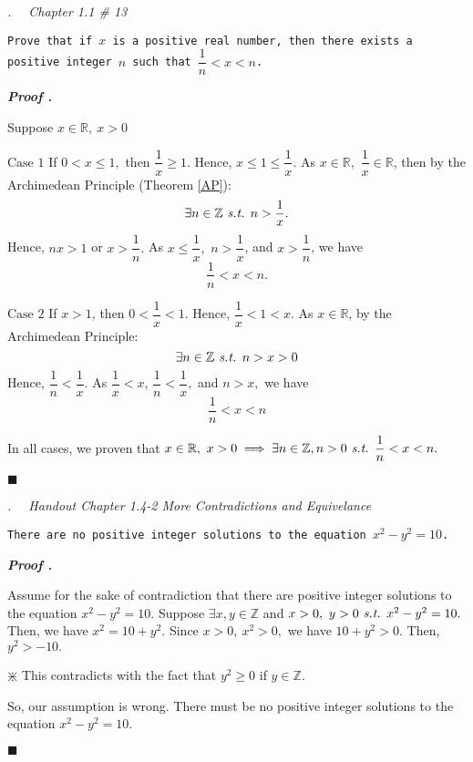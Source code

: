 \documentclass[11pt,letter]{article}
\newcounter{nq}[section]
\newcounter{np}[section]
\newenvironment*{p}{\par\noindent\textbf{\textit{Proof \stepcounter{np}\thenp. }}\par}{\par\hfill $\blacksquare$\par}
\newenvironment*{q}[1]{\noindent\emph{\thesection.\stepcounter{nq}\thenq$\quad $ #1}\par\noindent\texttt}{}
\def\Z{{\mathbb{Z}}}
\def\R{{\mathbb{R}}}
\def\st{\emph{ s.t. }}
\begin{document}
\begin{framed}\begin{q}
	{Chapter 1.1 \# 13}
	{Prove that if $x$ is a positive real number, then there exists a positive integer $n$ such that $\dfrac{1}{n}<x<n$.}
\end{q}\end{framed}
\begin{p}
	Suppose $x\in\R,\ x>0$\par 
	$\boxed{\text{Case }1}$ If $0<x\leq1,$ then $\dfrac{1}{x}\geq1.$ Hence, $x\leq1\leq\dfrac{1}{x}.$ As $x\in\R,$ $\dfrac{1}{x}\in\R$, then by the Archimedean Principle (Theorem \ref{AP}): \[\exists n\in\Z\st n>\dfrac{1}{x}.\] Hence, $nx>1$ or $x>\dfrac{1}{n}.$ As $x\leq\dfrac{1}{x},$ $n>\dfrac{1}{x}$, and $x>\dfrac{1}{n}$, we have \[\frac{1}{n}<x<n.\]\par
	$\boxed{\text{Case }2}$ If $x>1$, then $0<\dfrac{1}{x}<1.$ Hence, $\dfrac{1}{x}<1<x.$ As $x\in\R$, by the Archimedean Principle: \[\exists n\in\Z\st n>x>0\] Hence, $\dfrac{1}{n}<\dfrac{1}{x}$. As $\dfrac{1}{x}<x$, $\dfrac{1}{n}<\dfrac{1}{x},$ and $n>x,$ we have \[\dfrac{1}{n}<x<n\]\par 
	In all cases, we proven that $x\in\R,\ x>0\implies\exists n\in\Z, n>0\st\dfrac{1}{n}<x<n.$
\end{p}

\begin{framed}\begin{q}
	{Handout Chapter 1.4-2 More Contradictions and Equivelance}
	{There are no positive integer solutions to the equation $x^2-y^2=10$.}
\end{q}\end{framed}
\begin{p}
	Assume for the sake of contradiction that there are positive integer solutions to the equation $x^2-y^2=10.$ Suppose $\exists x,y\in\Z$ and $x>0,\ y>0\st x^2-y^2=10.$ Then, we have $x^2=10+y^2.$ Since $x>0,\ x^2>0,$ we have $10+y^2>0.$ Then, $y^2>-10.$\begin{center}$\divideontimes$ This contradicts with the fact that $y^2\geq0$ if $y\in\Z.$\end{center} So, our assumption is wrong. There must be no positive integer solutions to the equation $x^2-y^2=10.$
\end{p}
\end{document}
